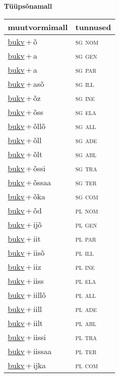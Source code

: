 
\vspace{1.8em}
\begin{minipage}{\textwidth}
\textbf{Tüüpsõnamall \,}\\

\begin{sideways}
\begin{tabular}{l l}
muutvormimall & tunnused \\
\hline
\underline{bukv}\,+\,õ & \textsc{ sg nom } \\
\underline{bukv}\,+\,a & \textsc{ sg gen } \\
\underline{bukv}\,+\,a & \textsc{ sg par } \\
\underline{bukv}\,+\,asõ & \textsc{ sg ill } \\
\underline{bukv}\,+\,õz & \textsc{ sg ine } \\
\underline{bukv}\,+\,õss & \textsc{ sg ela } \\
\underline{bukv}\,+\,õllõ & \textsc{ sg all } \\
\underline{bukv}\,+\,õll & \textsc{ sg ade } \\
\underline{bukv}\,+\,õlt & \textsc{ sg abl } \\
\underline{bukv}\,+\,õssi & \textsc{ sg tra } \\
\underline{bukv}\,+\,õssaa & \textsc{ sg ter } \\
\underline{bukv}\,+\,õka & \textsc{ sg com } \\
\underline{bukv}\,+\,õd & \textsc{ pl nom } \\
\underline{bukv}\,+\,ijõ & \textsc{ pl gen } \\
\underline{bukv}\,+\,iit & \textsc{ pl par } \\
\underline{bukv}\,+\,iisõ & \textsc{ pl ill } \\
\underline{bukv}\,+\,iiz & \textsc{ pl ine } \\
\underline{bukv}\,+\,iiss & \textsc{ pl ela } \\
\underline{bukv}\,+\,iillõ & \textsc{ pl all } \\
\underline{bukv}\,+\,iill & \textsc{ pl ade } \\
\underline{bukv}\,+\,iilt & \textsc{ pl abl } \\
\underline{bukv}\,+\,iissi & \textsc{ pl tra } \\
\underline{bukv}\,+\,iissaa & \textsc{ pl ter } \\
\underline{bukv}\,+\,ijka & \textsc{ pl com } \\
\end{tabular}
\end{sideways}
\label{tab:tüüpsõnamall-bukvõ}

\end{minipage}

